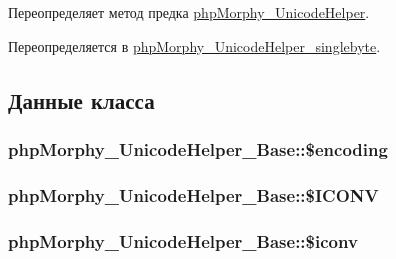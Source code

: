 Переопределяет метод предка \hyperlink{classphpMorphy__UnicodeHelper_ae8f19dea596da693c343df0f2d416acf}{phpMorphy\_\-UnicodeHelper}.



Переопределяется в \hyperlink{classphpMorphy__UnicodeHelper__singlebyte_a7ed10bd2d30a9503a0be9a114ededaeb}{phpMorphy\_\-UnicodeHelper\_\-singlebyte}.



\subsection{Данные класса}
\hypertarget{classphpMorphy__UnicodeHelper__Base_af33d0852c7eb485b94c506a32d52ccab}{
\subsubsection[{\$encoding}]{\setlength{\rightskip}{0pt plus 5cm}phpMorphy\_\-UnicodeHelper\_\-Base::\$encoding}}
\label{classphpMorphy__UnicodeHelper__Base_af33d0852c7eb485b94c506a32d52ccab}
\hypertarget{classphpMorphy__UnicodeHelper__Base_a0c25b8b25648dd0da93f3f4c88f0a2b5}{
\subsubsection[{\$ICONV}]{\setlength{\rightskip}{0pt plus 5cm}phpMorphy\_\-UnicodeHelper\_\-Base::\$ICONV}}
\label{classphpMorphy__UnicodeHelper__Base_a0c25b8b25648dd0da93f3f4c88f0a2b5}
\hypertarget{classphpMorphy__UnicodeHelper__Base_a967f83763bccb73c95e8878e579b26f6}{
\subsubsection[{\$iconv}]{\setlength{\rightskip}{0pt plus 5cm}phpMorphy\_\-UnicodeHelper\_\-Base::\$iconv}}
